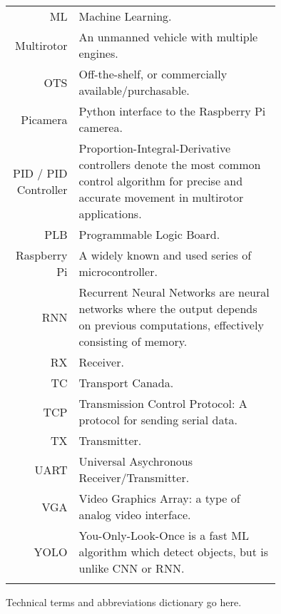 \begin{tabular}[h]{rp{0.75\linewidth}}
    ML & Machine Learning.\\
    Multirotor & An unmanned vehicle with multiple engines. \\
    OTS & Off-the-shelf, or commercially available/purchasable. \\
    Picamera & Python interface to the Raspberry Pi camerea. \\
    PID / PID Controller & Proportion-Integral-Derivative controllers denote the most common control algorithm for precise and accurate movement in multirotor applications.\cite{pid}\\
    PLB & Programmable Logic Board. \\
    Raspberry Pi & A widely known and used series of microcontroller. \\
    RNN & Recurrent Neural Networks are neural networks where the output depends on previous computations, effectively consisting of memory.\cite{rnn}\\
    RX & Receiver.\\
    TC & Transport Canada.\\
    TCP & Transmission Control Protocol: A protocol for sending serial data. \\
    TX & Transmitter.\\\
    UART & Universal Asychronous Receiver/Transmitter. \\
    VGA & Video Graphics Array: a type of analog video interface. \\
    YOLO & You-Only-Look-Once is a fast ML algorithm which detect objects, but is unlike CNN or RNN.\cite{yolo}\cite{yolo-2}\\
     & \\

    \hline

\end{tabular}

Technical terms and abbreviations dictionary go here.
